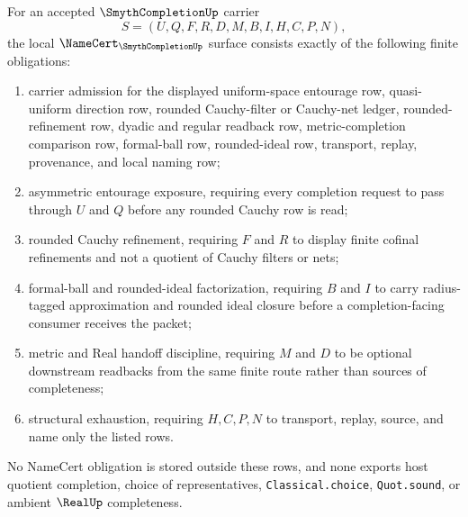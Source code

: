\begin{theorem}
\label{thm:smyth-completion-namecert-obligations}
For an accepted $\SmythCompletionUp$ carrier
$$
S=(U,Q,F,R,D,M,B,I,H,C,P,N),
$$
the local $\NameCert_{\SmythCompletionUp}$ surface consists exactly of the following finite obligations:
\begin{enumerate}
\item carrier admission for the displayed uniform-space entourage row, quasi-uniform direction row, rounded Cauchy-filter or Cauchy-net ledger, rounded-refinement row, dyadic and regular readback row, metric-completion comparison row, formal-ball row, rounded-ideal row, transport, replay, provenance, and local naming row;
\item asymmetric entourage exposure, requiring every completion request to pass through $U$ and $Q$ before any rounded Cauchy row is read;
\item rounded Cauchy refinement, requiring $F$ and $R$ to display finite cofinal refinements and not a quotient of Cauchy filters or nets;
\item formal-ball and rounded-ideal factorization, requiring $B$ and $I$ to carry radius-tagged approximation and rounded ideal closure before a completion-facing consumer receives the packet;
\item metric and Real handoff discipline, requiring $M$ and $D$ to be optional downstream readbacks from the same finite route rather than sources of completeness;
\item structural exhaustion, requiring $H,C,P,N$ to transport, replay, source, and name only the listed rows.
\end{enumerate}
No NameCert obligation is stored outside these rows, and none exports host quotient completion, choice of representatives, \texttt{Classical.choice}, \texttt{Quot.sound}, or ambient $\RealUp$ completeness.
\end{theorem}
